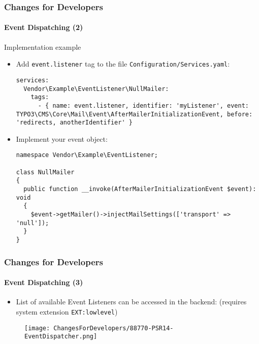 \begin{frame}[fragile]
	\frametitle{Changes for Developers}
	\framesubtitle{Event Dispatching (2)}

	\lstset{basicstyle=\tiny\ttfamily}

	Implementation example

	\begin{itemize}\smaller
		\item[\ding{202}] Add \texttt{event.listener} tag to the file \texttt{Configuration/Services.yaml}:

\begin{lstlisting}
services:
  Vendor\Example\EventListener\NullMailer:
    tags:
      - { name: event.listener, identifier: 'myListener', event: TYPO3\CMS\Core\Mail\Event\AfterMailerInitializationEvent, before: 'redirects, anotherIdentifier' }
\end{lstlisting}

		\item[\ding{203}] Implement your event object:

\begin{lstlisting}
namespace Vendor\Example\EventListener;

class NullMailer
{
  public function __invoke(AfterMailerInitializationEvent $event): void
  {
    $event->getMailer()->injectMailSettings(['transport' => 'null']);
  }
}
\end{lstlisting}

	\end{itemize}\normalsize

\end{frame}


\begin{frame}[fragile]
	\frametitle{Changes for Developers}
	\framesubtitle{Event Dispatching (3)}

	\lstset{basicstyle=\tiny\ttfamily}

	\begin{itemize}
		\item List of available Event Listeners can be accessed in the backend:\newline
			\smaller
				(requires system extension \texttt{EXT:lowlevel})
			\normalsize
	\end{itemize}

	\begin{figure}
		\texttt{[image: ChangesForDevelopers/88770-PSR14-EventDispatcher.png]}
	\end{figure}

\end{frame}


